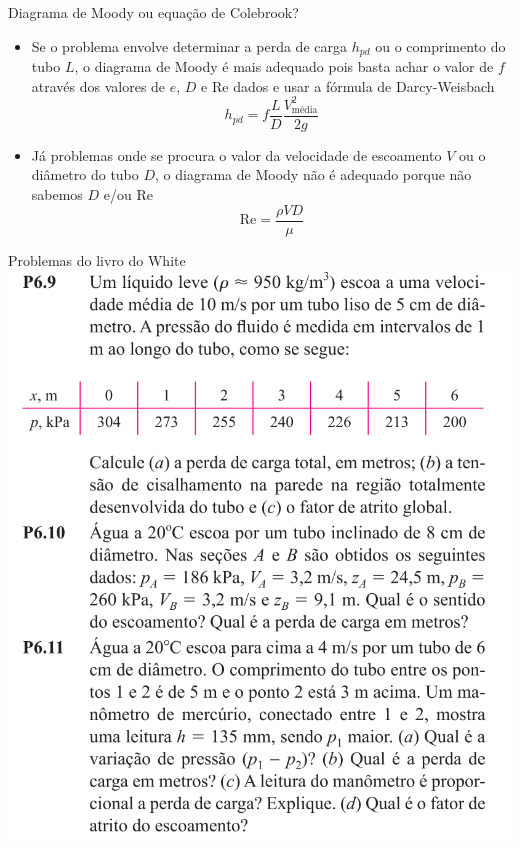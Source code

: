\documentclass[t,%
brazilian,%
11pt,%
aspectratio=169,%
table%
]{beamer}
\begin{document}
\begin{frame}{Diagrama de Moody ou equação de Colebrook?}
    \begin{itemize}
        \item Se o problema envolve determinar a perda de carga \(h_{pd}\) ou o comprimento do tubo
            \(L\), o diagrama de Moody é mais adequado pois basta achar o valor de \(f\) através dos valores
            de \(e\), \(D\) e \(\text{Re}\) dados e usar a fórmula de Darcy-Weisbach
            \[
                h_{pd} = f\frac{L}{D}\frac{V_\text{média}^2}{2g}
            \]
        \item Já problemas onde se procura o valor da velocidade de escoamento \(V\) ou o diâmetro do tubo \(D\), o diagrama de Moody
            não é adequado porque não sabemos \(D\) e/ou Re
            \[
                \text{Re} = \frac{\rho V D}{\mu}
            \]

    \end{itemize}
\end{frame}

\begin{frame}{Problemas do livro do White}
    \includegraphics[height=\textheight-28pt]{images/Captura de tela de 2025-05-13 15-07-43.png}
\end{frame}
\end{document}
